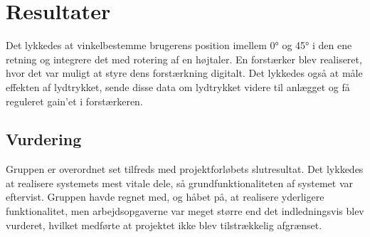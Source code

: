 \section{Resultater}
\label{chap:resultater}
Det lykkedes at vinkelbestemme brugerens position imellem 0° og 45° i den ene retning og integrere det med rotering af en højtaler.
En forstærker blev realiseret, hvor det var muligt at styre dens forstærkning digitalt.
Det lykkedes også at måle effekten af lydtrykket, sende disse data om lydtrykket videre til anlægget og få reguleret gain'et i forstærkeren.

\subsection{Vurdering}
Gruppen er overordnet set tilfreds med projektforløbets slutresultat. Det lykkedes at realisere systemets mest vitale dele, så grundfunktionaliteten af systemet var eftervist. Gruppen havde regnet med, og håbet på, at realisere yderligere funktionalitet, men arbejdsopgaverne var meget større end det indledningsvis blev vurderet, hvilket medførte at projektet ikke blev tilstrækkelig afgrænset.
